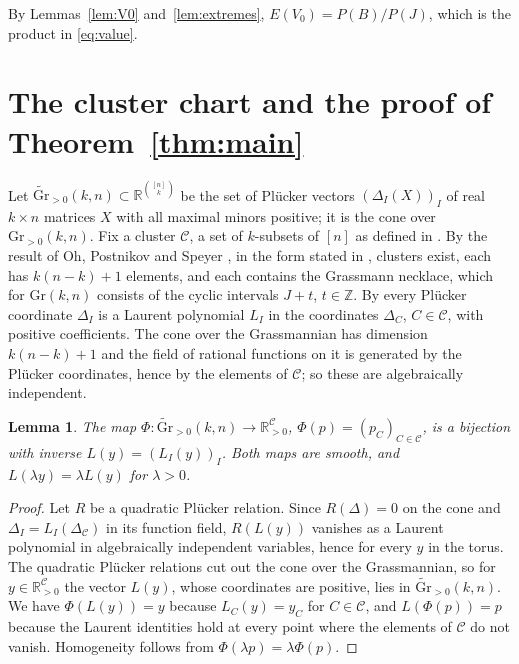 \documentclass[11pt]{article}
\newtheorem{lemma}[theorem]{Lemma}
\theoremstyle{remark}
\newcommand{\Gr}{\mathrm{Gr}}
\newcommand{\Z}{\mathbb{Z}}
\newcommand{\R}{\mathbb{R}}
\begin{document}
By Lemmas~\ref{lem:V0} and~\ref{lem:extremes}, $E(V_0)=P(B)/P(J)$, which is the product in \eqref{eq:value}.

\section{The cluster chart and the proof of Theorem~\ref{thm:main}}\label{sec:chart}

Let $\widetilde{\Gr}_{>0}(k,n)\subset\R^{\binom{[n]}{k}}$ be the set of Pl\"ucker vectors $(\Delta_I(X))_I$ of real $k\times n$ matrices $X$ with all maximal minors positive; it is the cone over $\Gr_{>0}(k,n)$. Fix a cluster $\mathcal{C}$, a set of $k$-subsets of $[n]$ as defined in \cite[Section~4.1]{ALS}. By the result of Oh, Postnikov and Speyer \cite{OPS}, in the form stated in \cite[Proposition~4.1]{ALS}, clusters exist, each has $k(n-k)+1$ elements, and each contains the Grassmann necklace, which for $\Gr(k,n)$ consists of the cyclic intervals $J+t$, $t\in\Z$. By \cite[Proposition~4.3]{ALS} every Pl\"ucker coordinate $\Delta_I$ is a Laurent polynomial $L_I$ in the coordinates $\Delta_C$, $C\in\mathcal{C}$, with positive coefficients. The cone over the Grassmannian has dimension $k(n-k)+1$ and the field of rational functions on it is generated by the Pl\"ucker coordinates, hence by the elements of $\mathcal{C}$; so these are algebraically independent.

\begin{lemma}\label{lem:chart}
The map $\Phi:\widetilde{\Gr}_{>0}(k,n)\to\R_{>0}^{\mathcal{C}}$, $\Phi(p)=(p_C)_{C\in\mathcal{C}}$, is a bijection with inverse $L(y)=(L_I(y))_I$. Both maps are smooth, and $L(\lambda y)=\lambda L(y)$ for $\lambda>0$.
\end{lemma}

\begin{proof}
Let $R$ be a quadratic Pl\"ucker relation. Since $R(\Delta)=0$ on the cone and $\Delta_I=L_I(\Delta_{\mathcal{C}})$ in its function field, $R(L(y))$ vanishes as a Laurent polynomial in algebraically independent variables, hence for every $y$ in the torus. The quadratic Pl\"ucker relations cut out the cone over the Grassmannian, so for $y\in\R^{\mathcal{C}}_{>0}$ the vector $L(y)$, whose coordinates are positive, lies in $\widetilde{\Gr}_{>0}(k,n)$. We have $\Phi(L(y))=y$ because $L_C(y)=y_C$ for $C\in\mathcal{C}$, and $L(\Phi(p))=p$ because the Laurent identities hold at every point where the elements of $\mathcal{C}$ do not vanish. Homogeneity follows from $\Phi(\lambda p)=\lambda\Phi(p)$.
\end{proof}
\end{document}

